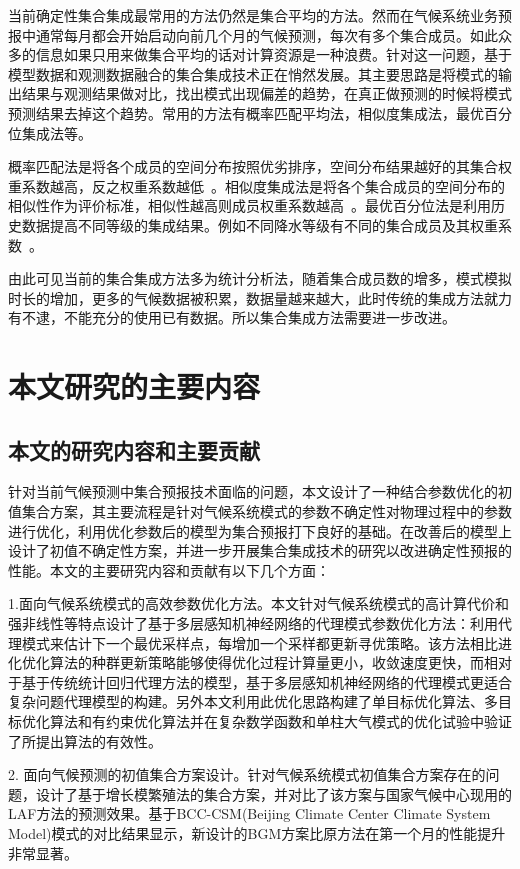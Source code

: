 当前确定性集合集成最常用的方法仍然是集合平均的方法。然而在气候系统业务预报中通常每月都会开始启动向前几个月的气候预测，每次有多个集合成员。如此众多的信息如果只用来做集合平均的话对计算资源是一种浪费。针对这一问题，基于模型数据和观测数据融合的集合集成技术正在悄然发展。其主要思路是将模式的输出结果与观测结果做对比，找出模式出现偏差的趋势，在真正做预测的时候将模式预测结果去掉这个趋势。常用的方法有概率匹配平均法，相似度集成法，最优百分位集成法等。

概率匹配法是将各个成员的空间分布按照优劣排序，空间分布结果越好的其集合权重系数越高，反之权重系数越低~\cite{ebert2001ability}。相似度集成法是将各个集合成员的空间分布的相似性作为评价标准，相似性越高则成员权重系数越高~\cite{陈力强2005短期集合预报中定量降水预报集合方法初探}。最优百分位法是利用历史数据提高不同等级的集成结果。例如不同降水等级有不同的集合成员及其权重系数~\cite{代刊2016中短期数字化天气预报技术现状及趋势}。

由此可见当前的集合集成方法多为统计分析法，随着集合成员数的增多，模式模拟时长的增加，更多的气候数据被积累，数据量越来越大，此时传统的集成方法就力有不逮，不能充分的使用已有数据。所以集合集成方法需要进一步改进。

\section{本文研究的主要内容}
\subsection{本文的研究内容和主要贡献}

针对当前气候预测中集合预报技术面临的问题，本文设计了一种结合参数优化的初值集合方案，其主要流程是针对气候系统模式的参数不确定性对物理过程中的参数进行优化，利用优化参数后的模型为集合预报打下良好的基础。在改善后的模型上设计了初值不确定性方案，并进一步开展集合集成技术的研究以改进确定性预报的性能。本文的主要研究内容和贡献有以下几个方面：

1.面向气候系统模式的高效参数优化方法。本文针对气候系统模式的高计算代价和强非线性等特点设计了基于多层感知机神经网络的代理模式参数优化方法：利用代理模式来估计下一个最优采样点，每增加一个采样都更新寻优策略。该方法相比进化优化算法的种群更新策略能够使得优化过程计算量更小，收敛速度更快，而相对于基于传统统计回归代理方法的模型，基于多层感知机神经网络的代理模式更适合复杂问题代理模型的构建。另外本文利用此优化思路构建了单目标优化算法、多目标优化算法和有约束优化算法并在复杂数学函数和单柱大气模式的优化试验中验证了所提出算法的有效性。

2. 面向气候预测的初值集合方案设计。针对气候系统模式初值集合方案存在的问题，设计了基于增长模繁殖法的集合方案，并对比了该方案与国家气候中心现用的LAF方法的预测效果。基于BCC-CSM(Beijing Climate Center Climate System Model)模式的对比结果显示，新设计的BGM方案比原方法在第一个月的性能提升非常显著。

